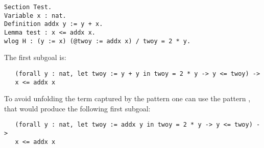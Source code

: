 \begin{lstlisting}
Section Test.
Variable x : nat.
Definition addx y := y + x.
Lemma test : x <= addx x.
wlog H : (y := x) (@twoy := addx x) / twoy = 2 * y.
\end{lstlisting}
\noindent
The first subgoal is:
\begin{lstlisting}
   (forall y : nat, let twoy := y + y in twoy = 2 * y -> y <= twoy) ->
   x <= addx x
\end{lstlisting}
\noindent
To avoid unfolding the term captured by the pattern  one 
can use the pattern , that would produce the following first
subgoal:
\begin{lstlisting}
   (forall y : nat, let twoy := addx y in twoy = 2 * y -> y <= twoy) ->
   x <= addx x
\end{lstlisting}

